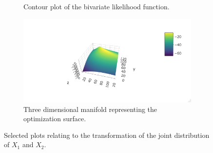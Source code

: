 \begin{enumerate}
\begin{figure}[H]
\begin{subfigure}{.5\textwidth}
	\caption{Contour plot of the bivariate likelihood function.}
  \label{fig:sfig1}
\end{subfigure}%
\begin{subfigure}{.5\textwidth}
  \centering
	\includegraphics[width=.8\linewidth]{plot_4_30_c_manifold.png}
  \caption{Three dimensional manifold representing the optimization surface.}
  \label{fig:sfig2}
\end{subfigure}
\caption{Selected plots relating to the transformation of the joint distribution of $X_1$ and $X_2$.}
\end{figure}


\end{enumerate}





